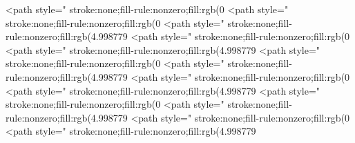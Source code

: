 <path style=" stroke:none;fill-rule:nonzero;fill:rgb(0%
<path style=" stroke:none;fill-rule:nonzero;fill:rgb(0%
<path style=" stroke:none;fill-rule:nonzero;fill:rgb(4.998779%
<path style=" stroke:none;fill-rule:nonzero;fill:rgb(0%
<path style=" stroke:none;fill-rule:nonzero;fill:rgb(4.998779%
<path style=" stroke:none;fill-rule:nonzero;fill:rgb(0%
<path style=" stroke:none;fill-rule:nonzero;fill:rgb(4.998779%
<path style=" stroke:none;fill-rule:nonzero;fill:rgb(0%
<path style=" stroke:none;fill-rule:nonzero;fill:rgb(4.998779%
<path style=" stroke:none;fill-rule:nonzero;fill:rgb(0%
<path style=" stroke:none;fill-rule:nonzero;fill:rgb(4.998779%
<path style=" stroke:none;fill-rule:nonzero;fill:rgb(0%
<path style=" stroke:none;fill-rule:nonzero;fill:rgb(4.998779%
